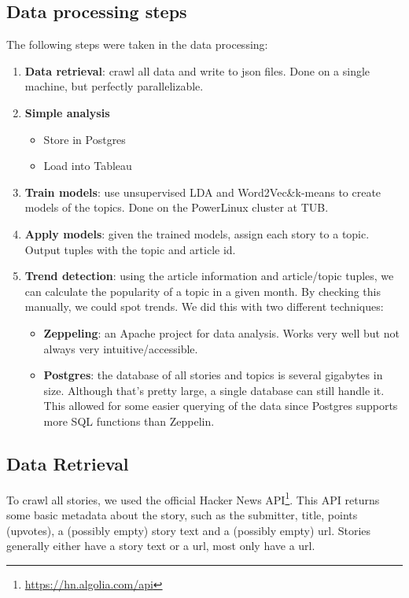 \subsection{Data processing steps}
The following steps were taken in the data processing:
\begin{enumerate}
	\item \textbf{Data retrieval}: crawl all data and write to json files. Done on a single machine, but perfectly parallelizable.
	\item \textbf{Simple analysis}
		\begin{itemize}
			\item Store in Postgres
			\item Load into Tableau
		\end{itemize}
	\item \textbf{Train models}: use unsupervised LDA and Word2Vec\&k-means to create models of the topics. Done on the PowerLinux cluster at TUB.
	\item \textbf{Apply models}: given the trained models, assign each story to a topic. Output tuples with the topic and article id.
	\item \textbf{Trend detection}: using the article information and article/topic tuples, we can calculate the popularity of a topic in a given month. By checking this manually, we could spot trends. We did this with two different techniques:
		\begin{itemize}
			\item \textbf{Zeppeling}: an Apache project for data analysis. Works very well but not always very intuitive/accessible.
			\item \textbf{Postgres}: the database of all stories and topics is several gigabytes in size. Although that's pretty large, a single database can still handle it. This allowed for some easier querying of the data since Postgres supports more SQL functions than Zeppelin.
		\end{itemize}
\end{enumerate}

\subsection{Data Retrieval}
To crawl all stories, we used the official Hacker News API\footnote{\url{https://hn.algolia.com/api}}. This API returns some basic metadata about the story, such as the submitter, title, points (upvotes), a (possibly empty) story text and a (possibly empty) url. Stories generally either have a story text or a url, most only have a url.

